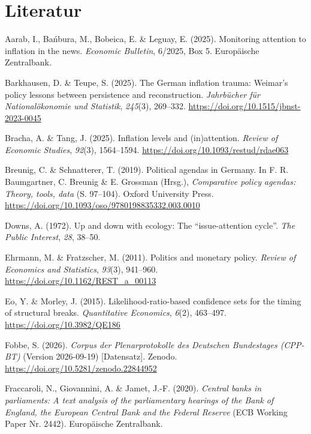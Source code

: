 \documentclass[11pt,a4paper]{article}
\newenvironment{literatur}{\begin{list}{}{\setlength{\leftmargin}{1.5em}\setlength{\itemindent}{-1.5em}\setlength{\itemsep}{0.35em}\small}\raggedright}{\end{list}}
\begin{document}
\section*{Literatur}

\begin{literatur}
\item Aarab, I., Bańbura, M., Bobeica, E. \& Leguay, E. (2025). Monitoring attention to inflation in the news. \emph{Economic Bulletin}, 6/2025, Box 5. Europäische Zentralbank.

\item Barkhausen, D. \& Teupe, S. (2025). The German inflation trauma: Weimar's policy lessons between persistence and reconstruction. \emph{Jahrbücher für Nationalökonomie und Statistik}, \emph{245}(3), 269--332. \url{https://doi.org/10.1515/jbnst-2023-0045}

\item Bracha, A. \& Tang, J. (2025). Inflation levels and (in)attention. \emph{Review of Economic Studies}, \emph{92}(3), 1564--1594. \url{https://doi.org/10.1093/restud/rdae063}

\item Breunig, C. \& Schnatterer, T. (2019). Political agendas in Germany. In F. R. Baumgartner, C. Breunig \& E. Grossman (Hrsg.), \emph{Comparative policy agendas: Theory, tools, data} (S. 97--104). Oxford University Press. \url{https://doi.org/10.1093/oso/9780198835332.003.0010}

\item Downs, A. (1972). Up and down with ecology: The “issue-attention cycle”. \emph{The Public Interest}, \emph{28}, 38--50.

\item Ehrmann, M. \& Fratzscher, M. (2011). Politics and monetary policy. \emph{Review of Economics and Statistics}, \emph{93}(3), 941--960. \url{https://doi.org/10.1162/REST\_a\_00113}

\item Eo, Y. \& Morley, J. (2015). Likelihood-ratio-based confidence sets for the timing of structural breaks. \emph{Quantitative Economics}, \emph{6}(2), 463--497. \url{https://doi.org/10.3982/QE186}

\item Fobbe, S. (2026). \emph{Corpus der Plenarprotokolle des Deutschen Bundestages (CPP-BT)} (Version 2026-09-19) {[}Datensatz{]}. Zenodo. \url{https://doi.org/10.5281/zenodo.22844952}

\item Fraccaroli, N., Giovannini, A. \& Jamet, J.-F. (2020). \emph{Central banks in parliaments: A text analysis of the parliamentary hearings of the Bank of England, the European Central Bank and the Federal Reserve} (ECB Working Paper Nr. 2442). Europäische Zentralbank.


\end{literatur}
\end{document}
